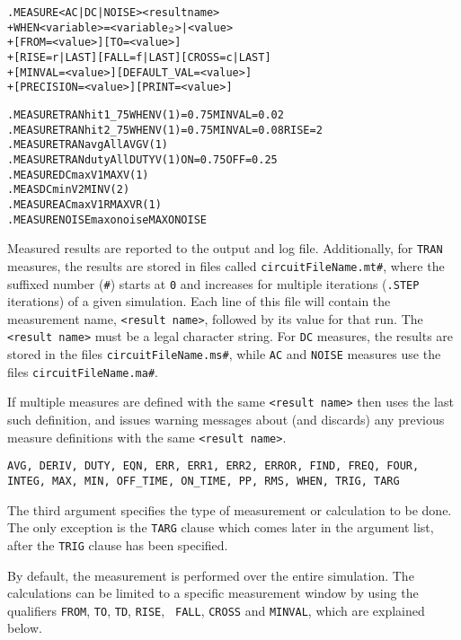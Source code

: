 \begin{Command}
\begin{alltt}
.MEASURE <AC|DC|NOISE> <result name>
+ WHEN <variable>=<variable\(\sb{2}\)>|<value>
+ [FROM=<value>] [TO=<value>]
+ [RISE=r|LAST] [FALL=f|LAST] [CROSS=c|LAST]
+ [MINVAL=<value>] [DEFAULT_VAL=<value>]
+ [PRECISION=<value>] [PRINT=<value>]
\end{alltt}

\examples
\begin{alltt}
.MEASURE TRAN hit1_75 WHEN V(1)=0.75 MINVAL=0.02
.MEASURE TRAN hit2_75 WHEN V(1)=0.75 MINVAL=0.08 RISE=2
.MEASURE TRAN avgAll AVG V(1)
.MEASURE TRAN dutyAll DUTY V(1) ON=0.75 OFF=0.25
.MEASURE DC maxV1 MAX V(1)
.MEAS DC minV2 MIN V(2)
.MEASURE AC maxV1R MAX VR(1)
.MEASURE NOISE maxonoise MAX ONOISE
\end{alltt}

\arguments

\begin{Arguments}

Measured results are reported to the output and log file.
Additionally, for \texttt{TRAN} measures, the results are stored in
files called \texttt{circuitFileName.mt\#}, where the suffixed number
(\texttt{\#}) starts at \texttt{0} and increases for multiple
iterations (\texttt{.STEP} iterations) of a given simulation. Each
line of this file will contain the measurement name, \texttt{<result
name>}, followed by its value for that run.  The \texttt{<result
name>} must be a legal \Xyce{} character string.  For \texttt{DC} measures,
the results are stored in the files \texttt{circuitFileName.ms\#},
while \texttt{AC} and \texttt{NOISE} measures use the files
\texttt{circuitFileName.ma\#}.

If multiple measures are defined with the same \texttt{<result name>} then
\Xyce{} uses the last such definition, and issues warning messages about
(and discards) any previous measure definitions with the same
\texttt{<result name>}.


\texttt{AVG, DERIV, DUTY, EQN, ERR, ERR1, ERR2, ERROR, FIND, FREQ, FOUR, INTEG, MAX, MIN, OFF\_TIME, ON\_TIME, PP, RMS, WHEN, TRIG, TARG}

The third argument specifies the type of measurement or calculation to
be done. The only exception is the {\tt TARG} clause which comes later
in the argument list, after the {\tt TRIG} clause has been specified.

By default, the measurement is performed over the entire simulation.
The calculations can be limited to a specific measurement window by
using the qualifiers {\tt FROM}, {\tt TO}, {\tt TD}, {\tt RISE}, {\tt
FALL}, {\tt CROSS} and {\tt MINVAL}, which are explained below.


\end{Arguments}
\end{Command}

